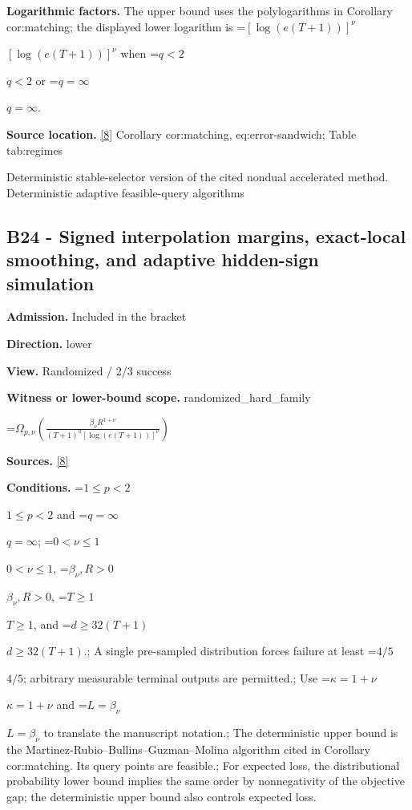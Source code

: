 \documentclass[10pt,a4paper]{article}
\newcommand{\AtlasMath}[1]{\par\begingroup\centering\setbox0=\hbox{$\displaystyle #1$}\ifdim\wd0>1.4\linewidth\typeout{ATLAS WIDE FORMULA: \the\wd0}\fi\ifdim\wd0>\linewidth\resizebox{\linewidth}{!}{\box0}\else\box0\fi\par\endgroup}
\newcommand{\AtlasInlineMath}[1]{\begingroup\setbox0=\hbox{$#1$}\ifdim\wd0>.4\linewidth\endgroup\AtlasMath{#1}\else\endgroup$#1$\fi}
\begin{document}
\textbf{Logarithmic factors.} The upper bound uses the polylogarithms in Corollary cor:matching; the displayed lower logarithm is \AtlasInlineMath{[\log(e(T+1))]^\nu} when \AtlasInlineMath{q<2} or \AtlasInlineMath{q=\infty}.



\textbf{Source location.} \href{https://github.com/WU-Wendao/Colombo/blob/main/colombo_sensorium/Complexity_altas/data/sources/colombo/B1/manuscript.pdf}{[8]} Corollary cor:matching, eq:error-sandwich; Table tab:regimes



Deterministic stable-selector version of the cited nondual accelerated method. Deterministic adaptive feasible-query algorithms



\subsection{B24 - Signed interpolation margins, exact-local smoothing, and adaptive hidden-sign simulation}


\textbf{Admission.} Included in the bracket



\textbf{Direction.} lower



\textbf{View.} Randomized / 2/3 success



\textbf{Witness or lower-bound scope.} randomized\_hard\_family



\AtlasMath{\Omega_{p,\nu}\!\left(\frac{\beta_\nu R^{1+\nu}}{(T+1)^a[\log(e(T+1))]^\nu}\right)}


\textbf{Sources.} \href{https://github.com/WU-Wendao/Colombo/blob/main/colombo_sensorium/Complexity_altas/data/sources/colombo/B1/manuscript.pdf}{[8]}



\textbf{Conditions.} \AtlasInlineMath{1\le p<2} and \AtlasInlineMath{q=\infty}; \AtlasInlineMath{0<\nu\le1}, \AtlasInlineMath{\beta_\nu,R>0}, \AtlasInlineMath{T\ge1}, and \AtlasInlineMath{d\ge32(T+1)}.; A single pre-sampled distribution forces failure at least \AtlasInlineMath{4/5}; arbitrary measurable terminal outputs are permitted.; Use \AtlasInlineMath{\kappa=1+\nu} and \AtlasInlineMath{L=\beta_\nu} to translate the manuscript notation.; The deterministic upper bound is the Martinez-Rubio--Bullins--Guzman--Molina algorithm cited in Corollary cor:matching. Its query points are feasible.; For expected loss, the distributional probability lower bound implies the same order by nonnegativity of the objective gap; the deterministic upper bound also controls expected loss.
\end{document}
